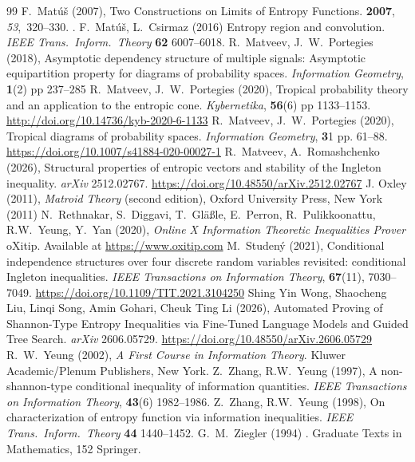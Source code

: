 \documentclass[a4paper]{IEEEtran}
\theoremstyle{definition}
\begin{document}
\begin{thebibliography}{99}
 F.~Mat{\'u}{\v{s}} (2007),
\newblock Two Constructions on Limits of Entropy Functions.
 {\bf 2007}, {\em 53},~320--330.
.
%
  F.~Mat\'{u}\v{s}, L.~Csirmaz (2016)
   Entropy region and convolution.
   \emph{IEEE Trans.\ Inform.\ Theory} {\bf 62} 6007--6018.
%
 R.~Matveev, J.~W.~Portegies (2018),
 Asymptotic dependency structure
of multiple signals: Asymptotic equipartition property for diagrams of probability
spaces.
 \emph{Information Geometry}, {\bf1}(2) pp 237--285
%
 R.~Matveev, J.~W.~Portegies (2020),
 Tropical probability theory and an application to the entropic cone. 
 \emph{Kybernetika}, {\bf56}(6) pp 1133--1153.
 \url{http://doi.org/10.14736/kyb-2020-6-1133}
%
  R.~Matveev, J.~W.~Portegies (2020),
  Tropical diagrams of probability spaces.
  \emph{Information Geometry}, {\bf3}1 pp. 61--88.
  \url{https://doi.org/10.1007/s41884-020-00027-1}
%
 R.~Matveev, A.~Romashchenko (2026),
  Structural properties of entropic vectors and stability of the Ingleton
inequality.
  \emph{arXiv} 2512.02767.
  \url{https://doi.org/10.48550/arXiv.2512.02767}
%
  J. Oxley (2011),
  \emph{Matroid Theory} (second edition), 
  Oxford University Press, New York (2011)
%
  N.~Rethnakar, S.~Diggavi, T.~Gläßle, E.~Perron, R.~Pulikkoonattu, 
  R.W.~Yeung, Y.~Yan (2020), 
  \emph{Online X Information Theoretic Inequalities Prover} oXitip. 
  Available at \url{https://www.oxitip.com}
%
M.~Studen\'y (2021), 
  Conditional independence structures over four discrete random variables
  revisited: conditional Ingleton inequalities.
 \emph{IEEE Transactions on Information Theory}, {\bf67}(11), 7030--7049.
 \url{https://doi.org/10.1109/TIT.2021.3104250}
%
 Shing Yin Wong, Shaocheng Liu, Linqi Song, Amin Gohari, Cheuk Ting Li
(2026),
   Automated Proving of Shannon-Type Entropy Inequalities via Fine-Tuned
   Language Models and Guided Tree Search.
   \emph{arXiv} 2606.05729.
   \url{https://doi.org/10.48550/arXiv.2606.05729}
%
  R.~W.~Yeung (2002),
   \emph{A First Course in Information Theory}.
   Kluwer Academic/Plenum Publishers, New York.
%
 Z.~Zhang, R.W.~Yeung (1997),
 A non-shannon-type conditional inequality of information quantities.
 \emph{IEEE Transactions on Information Theory}, {\bf 43}(6) 1982--1986.
%
  Z.~Zhang, R.W.~Yeung (1998),
   On characterization of entropy function via information inequalities.
   \emph{IEEE Trans.\ Inform.\ Theory} {\bf 44} 1440--1452.
%
 G.~M.~Ziegler (1994)
  .
  \newblock Graduate Texts in Mathematics, 152 Springer.
%
\end{thebibliography}
\end{document}
